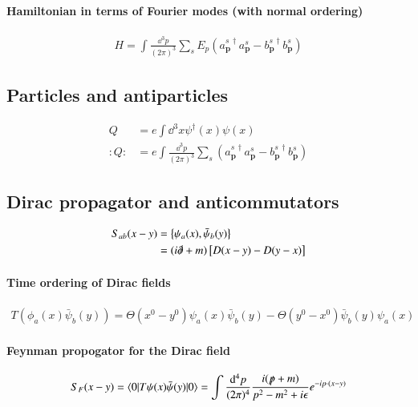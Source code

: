 \documentclass{scrartcl}
\numberwithin{equation}{section}
\begin{document}
\paragraph{Hamiltonian in terms of Fourier modes (with normal ordering)}
\begin{align}
	H = \int \frac{\dd^3 p}{(2\pi)^3} \sum_s E_p (a_{\pmb{p}}^{s\,\dagger}a_{\pmb{p}}^{s}-b_{\pmb{p}}^{s\,\dagger}b_{\pmb{p}}^{s})
\end{align}
\subsection{Particles and antiparticles}
\begin{align}
	Q &= e \int \dd^3 x \psi^\dagger(x)\psi(x) \\
	:Q: &= e \int \frac{\dd^3 p}{(2\pi)^3} \sum_s (a_{\pmb{p}}^{s\,\dagger}a_{\pmb{p}}^s - b_{\pmb{p}}^{s\,\dagger}b_{\pmb{p}}^s)
\end{align}
\subsection{Dirac propagator and anticommutators}
\begin{align}
	\begin{split}
	S_{ab}(x-y) &= \left\{ \psi_a(x), \bar{\psi}_b(y) \right\} \\
				&= (i\slashed{\partial}+m) \left[ D(x-y)-D(y-x) \right]
	\end{split}
\end{align}
\paragraph{Time ordering of Dirac fields}
\begin{align}
	T(\phi_a(x)\bar{\psi}_b(y)) = \Theta(x^0 - y^0)\psi_a(x)\bar{\psi}_b(y) - \Theta(y^0 - x^0) \bar{\psi}_b(y)\psi_a(x)
\end{align}
\paragraph{Feynman propogator for the Dirac field}
\begin{align}
	S_F(x-y) = \braket{0| T \psi(x)\bar{\psi}(y) |0} = \int \frac{\dd^4 p}{(2\pi)^4} \frac{i(\slashed{p}+m)}{p^2-m^2+i\epsilon} e^{-ip\cdot(x-y)}
\end{align}
\end{document}
